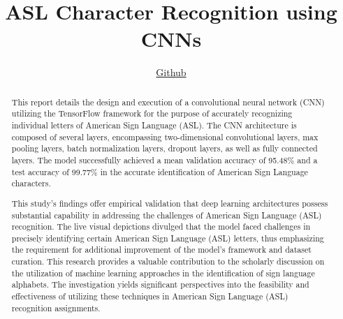 \documentclass[conference]{IEEEtran}
\begin{document}
\title{ASL Character Recognition using CNNs
}

\author{
\href{https://github.com/ATESAM-ABDULLAH}{Github}
}

\maketitle
\begin{abstract}
This report details the design and execution of a convolutional neural network (CNN) utilizing the TensorFlow framework for the purpose of accurately recognizing individual letters of American Sign Language (ASL). The CNN architecture is composed of several layers, encompassing two-dimensional convolutional layers, max pooling layers, batch normalization layers, dropout layers, as well as fully connected layers. The model successfully achieved a mean validation accuracy of 95.48\% and a test accuracy of 99.77\% in the accurate identification of American Sign Language characters.

This study's findings offer empirical validation that deep learning architectures possess substantial capability in addressing the challenges of American Sign Language (ASL) recognition. The live visual depictions divulged that the model faced challenges in precisely identifying certain American Sign Language (ASL) letters, thus emphasizing the requirement for additional improvement of the model's framework and dataset curation. This research provides a valuable contribution to the scholarly discussion on the utilization of machine learning approaches in the identification of sign language alphabets. The investigation yields significant perspectives into the feasibility and effectiveness of utilizing these techniques in American Sign Language (ASL) recognition assignments.

\end{abstract}

\end{document}
